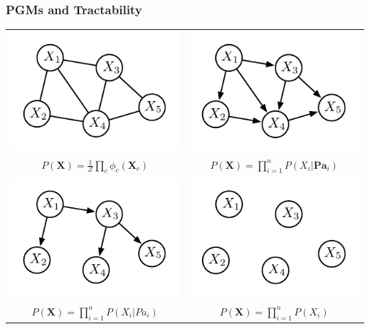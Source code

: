 \documentclass[xcolor={usenames,dvipsnames,svgnames}, compress]{beamer}
\begin{document}
\begin{frame}[t]
  \frametitle{PGMs and Tractability}
  \begin{table}[!ht]
    \setlength{\tabcolsep}{25pt}
    \centering
    \begin{tabular}{c c}
      
      \includegraphics[width=0.33\linewidth]{figures/mrf} &
                                                            \includegraphics[width=0.33\linewidth]{figures/bn}\\
      \addlinespace[-0.2cm]
      \scriptsize  $P(\mathbf{X})=\frac{1}{Z}\prod_{c}\phi_{c}(\mathbf{X}_{c})$
                                                          & 
      \scriptsize
                                                            $P(\mathbf{X})=\prod_{i=1}^nP(X_{i}|\mathbf{Pa}_{i})$\\
      \addlinespace[0.5cm]
      \includegraphics[width=0.33\linewidth]{figures/clt} &
                                                            \includegraphics[width=0.33\linewidth]{figures/nf}\\
      \addlinespace[-0.2cm]
      \scriptsize
      $P(\mathbf{X})=\prod_{i=1}^nP(X_{i}|Pa_{i})$ &
      \scriptsize $P(\mathbf{X})=\prod_{i=1}^nP(X_{i})$                                                              
    \end{tabular}
  \end{table}
\end{frame}
\end{document}
